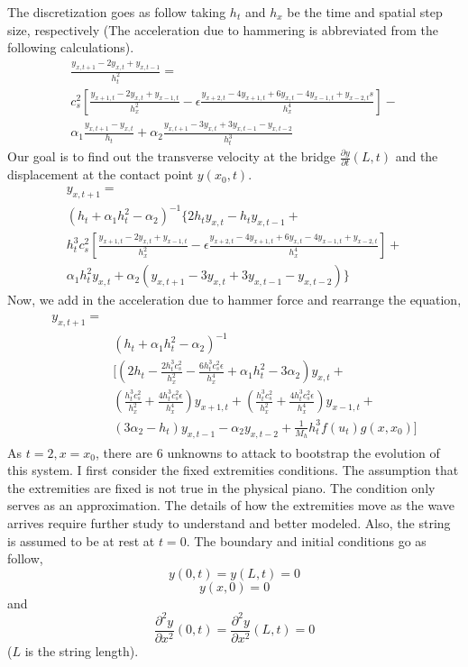 \documentclass[a4paper,12pt]{article}
\begin{document}
	   The discretization goes as follow taking $h_t$ and $h_x$ be the time and spatial step size, respectively (The acceleration due to hammering is abbreviated from the following calculations).
	   \begin{multline}
	   \frac{y_{x,t+1} - 2y_{x,t} + y_{x,t-1}}{h_t^2} =\\
	      c_s^2[\frac{y_{x+1,t} - 2y_{x,t} + y_{x-1,t}}{h_x^2} -
	            \epsilon \frac{y_{x+2,t} - 4y_{x+1,t} + 6y_{x,t} - 4y_{x-1,t} + y_{x-2,t}s}{h_x^4}] - \\
	            \alpha_1 \frac{y_{x,t+1} - y_{x,t}}{h_t} + 
	            \alpha_2 \frac{y_{x,t+1} - 3y_{x,t} + 3y_{x,t-1} - y_{x,t-2}}{h_t^3} 
		\end{multline}
		Our goal is to find out the transverse velocity at the bridge $\frac{\partial y}{\partial t}(L, t)$ and the displacement at the contact point $y(x_0, t)$.
		\begin{multline}
	    y_{x,t+1} =\\
	      (h_t + \alpha_1 h_t^2 - \alpha_2)^{-1}
	      \{2h_t y_{x,t} - h_t y_{x,t-1} +\\
	      h_t^3 c_s^2[\frac{y_{x+1,t} - 2y_{x,t} + y_{x-1,t}}{h_x^2} -
	            \epsilon \frac{y_{x+2,t} - 4y_{x+1,t} + 6y_{x,t} - 4y_{x-1,t} + y_{x-2,t}}{h_x^4}] + \\
	            \alpha_1 h_t^2 y_{x,t} + 
	            \alpha_2 (y_{x,t+1} - 3y_{x,t} + 3y_{x,t-1} - y_{x,t-2})\}
		\end{multline}
		Now, we add in the acceleration due to hammer force and rearrange the equation,
		\begin{multline}
		\begin{aligned}
	    y_{x,t+1} =&\\
	      &(h_t + \alpha_1 h_t^2 - \alpha_2)^{-1}\\
	      &[(2h_t - 
	        \frac{2h_t^3c_s^2}{h_x^2} - 
	        \frac{6h_t^3c_s^2\epsilon}{h_x^4} + 
	        \alpha_1h_t^2 - 3\alpha_2)y_{x,t} +\\
	      &(\frac{h_t^3c_s^2}{h_x^2} + 
	         \frac{4h_t^3c_s^2\epsilon}{h_x^4})y_{x+1,t} +
	        (\frac{h_t^3c_s^2}{h_x^2} + 
	         \frac{4h_t^3c_s^2\epsilon}{h_x^4})y_{x-1,t} + \\
	       &(3\alpha_2 - h_t)y_{x,t-1} - \alpha_2 y_{x,t-2} + 
	        \frac{1}{M_h} h_t^3 f(u_t) g(x,x_0) ]
	    \end{aligned}
		\end{multline}
		As $t = 2, x = x_0$, there are 6 unknowns to attack to bootstrap the evolution of this system. I first consider the fixed extremities conditions. The assumption that the extremities are fixed is not true in the physical piano. The condition only serves as an approximation. The details of how the extremities move as the wave arrives require further study to understand and better modeled. Also, the string is assumed to be at rest at $t = 0$. The boundary and initial conditions go as follow, 
		\[ y(0,t) = y(L,t) = 0 \]
		\[ y(x,0) = 0 \]
		and
		\[ \frac{\partial^2 y}{\partial x^2} (0,t) = 
		   \frac{\partial^2 y}{\partial x^2} (L,t) = 0 \]
		($L$ is the string length).
		
\end{document}
